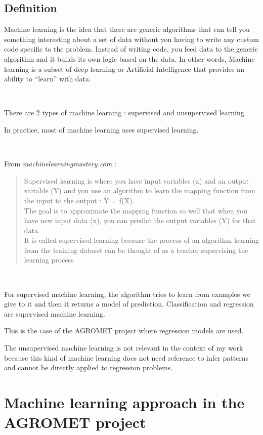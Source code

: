 \documentclass[12pt,twoside]{reedthesis}
\theoremstyle{definition}
\theoremstyle{definition}
\theoremstyle{definition}
\theoremstyle{remark}
\begin{document}
\subsection{Definition}\label{definition}

Machine learning is the idea that there are generic algorithms that can
tell you something interesting about a set of data without you having to
write any custom code specific to the problem. Instead of writing code,
you feed data to the generic algorithm and it builds its own logic based
on the data. In other words, Machine learning is a subset of deep
learning or Artificial Intelligence that provides an ability to
``learn'' with data.

~

There are 2 types of machine learning : supervised and unsupervised
learning.

In practice, most of machine learning uses supervised learning.

~

From \emph{machinelearningmastery.com} :
\begin{quote}
Supervised learning is where you have input variables (x) and an output
variable (Y) and you use an algorithm to learn the mapping function from
the input to the output : Y = f(X).\\
The goal is to approximate the mapping function so well that when you
have new input data (x), you can predict the output variables (Y) for
that data.\\
It is called supervised learning because the process of an algorithm
learning from the training dataset can be thought of as a teacher
supervising the learning process
\end{quote}
~

For supervised machine learning, the algorithm tries to learn from
examples we give to it and then it returns a model of prediction.
Classification and regression are supervised machine learning.

This is the case of the AGROMET project where regression models are
used.

The unsupervised machine learning is not relevant in the context of my
work because this kind of machine learning does not need reference to
infer patterns and cannot be directly applied to regression problems.

\section{Machine learning approach in the AGROMET
project}\label{machine-learning-approach-in-the-agromet-project}
\end{document}
